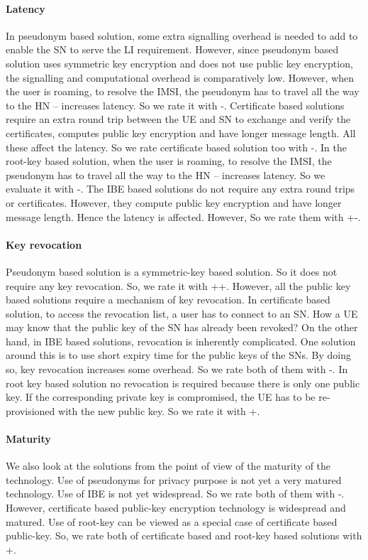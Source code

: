 \documentclass[conference]{IEEEtran}
\begin{document}
\paragraph{Latency}
In pseudonym based solution, some extra signalling overhead is needed to add to enable the SN to serve the LI requirement. However, since pseudonym based solution uses symmetric key encryption and does not use public key encryption, the signalling and computational overhead is comparatively low. However, when the user is roaming, to resolve the IMSI, the pseudonym has to travel all the way to the HN -- increases latency. So we rate it with -. Certificate based solutions require an extra round trip between the UE and SN to exchange and verify the certificates, computes public key encryption and have longer message length. All these affect the latency. So we rate certificate based solution too with -. In the root-key based solution, when the user is roaming, to resolve the IMSI, the pseudonym has to travel all the way to the HN -- increases latency. So we evaluate it with -. The IBE based solutions do not require any extra round trips or certificates. However, they compute public key encryption and have longer message length. Hence the latency is affected. However, So we rate them with +-.


\paragraph{Key revocation}
Pseudonym based solution is a symmetric-key based solution. So it does not require any key revocation. So, we rate it with ++. However, all the public key based solutions require a mechanism of key revocation. In certificate based solution, to access the revocation list, a user has to connect to an SN. How a UE may know that the public key of the SN has already been revoked? On the other hand, in IBE based solutions, revocation is inherently complicated. One solution around this is to use short expiry time for the public keys of the SNs. By doing so, key revocation increases some overhead. So we rate both of them with -. In root key based solution no revocation is required because there is only one public key. If the corresponding private key is compromised, the UE has to be re-provisioned with the new public key. So we rate it with +.

\paragraph{Maturity}
We also look at the solutions from the point of view of the maturity of the technology. Use of pseudonyms for privacy purpose is not yet a very matured technology. Use of IBE is not yet widespread. So we rate both of them with -. However, certificate based public-key encryption technology is widespread and matured. Use of root-key can be viewed as a special case of certificate based public-key. So, we rate both of certificate based and root-key based solutions with +.
\end{document}
